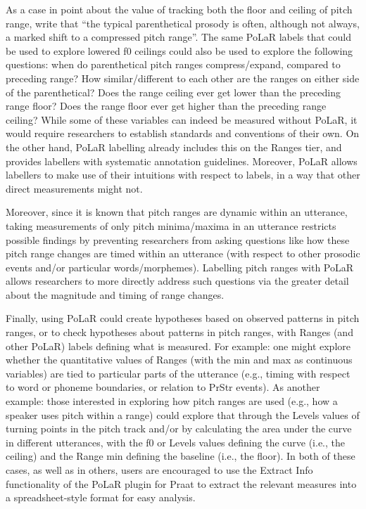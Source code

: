 \documentclass[11pt, twoside]{memoir}
\begin{document}
As a case in point about the value of tracking both the floor and ceiling of pitch range, \citet{dehewichmann10} write that “the typical parenthetical prosody is often, although not always, a marked shift to a compressed pitch range”. The same PoLaR labels that could be used to explore lowered f0 ceilings could also be used to explore the following questions: when do parenthetical pitch ranges compress\slash expand, compared to preceding range? How similar\slash different to each other are the ranges on either side of the parenthetical? Does the range ceiling ever get lower than the preceding range floor? Does the range floor ever get higher than the preceding range ceiling? While some of these variables can indeed be measured without PoLaR, it would require researchers to establish standards and conventions of their own. On the other hand, PoLaR labelling already includes this on the Ranges tier, and provides labellers with systematic annotation guidelines. Moreover, PoLaR allows labellers to make use of their intuitions with respect to labels, in a way that other direct measurements might not. 

Moreover, since it is known that pitch ranges are dynamic within an utterance, taking measurements of only pitch minima\slash maxima in an utterance restricts possible findings by preventing researchers from asking questions like how these pitch range changes are timed within an utterance (with respect to other prosodic events and/or particular words\slash morphemes). Labelling pitch ranges with PoLaR allows researchers to more directly address such questions via the greater detail about the magnitude and timing of range changes.  

Finally, using PoLaR could create hypotheses based on observed patterns in pitch ranges, or to check hypotheses about patterns in pitch ranges, with Ranges (and other PoLaR) labels defining what is measured. For example: one might explore whether the quantitative values of Ranges (with the min and max as continuous variables) are tied to particular parts of the utterance (e.g., timing with respect to word or phoneme boundaries, or relation to PrStr events). As another example: those interested in exploring how pitch ranges are used (e.g., how a speaker uses pitch within a range) could explore that through the Levels values of turning points in the pitch track and/or by calculating the area under the curve in different utterances, with the f0 or Levels values defining the curve (i.e., the ceiling) and the Range min defining the baseline (i.e., the floor). In both of these cases, as well as in others, users are encouraged to use the Extract Info functionality of the PoLaR plugin for Praat to extract the relevant measures into a spreadsheet-style format for easy analysis.
\end{document}
